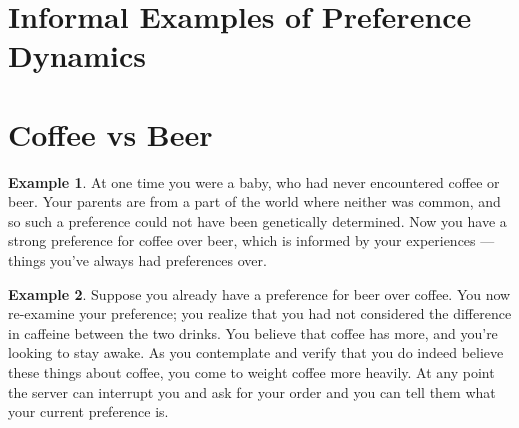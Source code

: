 \documentclass{article}
\theoremstyle{plain}
\theoremstyle{definition}
\newtheorem{example}{Example}[section]
\theoremstyle{remark}
\begin{document}
	\section{Informal Examples of Preference Dynamics}
%	


	\section{Coffee vs Beer}
	\begin{example}
		At one time you were a baby, who had never encountered coffee or beer. Your parents are from a part of the world where neither was common, and so such a preference could not have been genetically determined. Now you have a strong preference for coffee over beer, which is informed by your experiences --- things you've always had preferences over.
	\end{example}
	
	\begin{example}
		Suppose you already have a preference for beer over coffee. You now re-examine your preference; you realize that you had not considered the difference in caffeine between the two drinks. You believe that coffee has more, and you're looking to stay awake. As you contemplate and verify that you do indeed believe these things about coffee, you come to weight coffee more heavily. At any point the server can interrupt you and ask for your order and you can tell them what your current preference is.
	\end{example}
\end{document}
